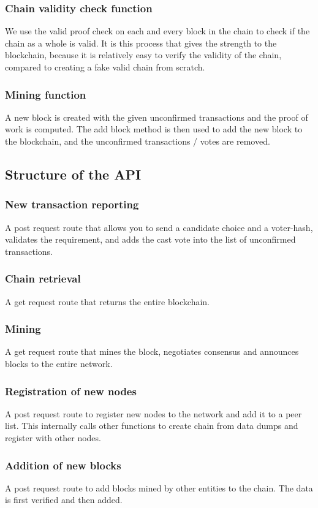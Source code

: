 \documentclass{article}
\begin{document}
    \subsubsection{Chain validity check function}
    We use the valid proof check on each and every block in the chain to check if the chain as a whole is valid. It is this process that gives the strength to the blockchain, because it is relatively easy to verify the validity of the chain, compared to creating a fake valid chain from scratch.
    \subsubsection{Mining function}
    A new block is created with the given unconfirmed transactions and the proof of work is computed. The add block method is then used to add the new block to the blockchain, and the unconfirmed transactions / votes are removed.
    \subsection{Structure of the API}
    \subsubsection{New transaction reporting}
    A post request route that allows you to send a candidate choice and a voter-hash, validates the
    requirement, and adds the cast vote into the list of unconfirmed transactions.
    \subsubsection{Chain retrieval}
    A get request route that returns the entire blockchain.
    \subsubsection{Mining}
    A get request route that mines the block, negotiates consensus and announces blocks to the entire network.
    \subsubsection{Registration of new nodes}
    A post request route to register new nodes to the network and add it to a peer list. This internally calls other functions to create chain from data dumps and register with other nodes.
    \subsubsection{Addition of new blocks}
    A post request route to add blocks mined by other entities to the chain. The data is first verified and then added.
\end{document}
